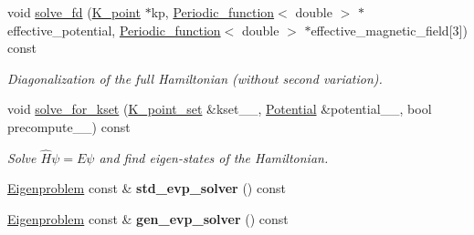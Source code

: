 \begin{DoxyCompactItemize}
void \hyperlink{classsirius_1_1_band_a7a1451542ba6a78e082bd79b68aee540}{solve\+\_\+fd} (\hyperlink{classsirius_1_1_k__point}{K\+\_\+point} $\ast$kp, \hyperlink{classsirius_1_1_periodic__function}{Periodic\+\_\+function}$<$ double $>$ $\ast$effective\+\_\+potential, \hyperlink{classsirius_1_1_periodic__function}{Periodic\+\_\+function}$<$ double $>$ $\ast$effective\+\_\+magnetic\+\_\+field\mbox{[}3\mbox{]}) const 
\begin{DoxyCompactList}\small\item\em Diagonalization of the full Hamiltonian (without second variation). \end{DoxyCompactList}\item 
void \hyperlink{classsirius_1_1_band_a4d39e6e67825eef410af2015d72c06bd}{solve\+\_\+for\+\_\+kset} (\hyperlink{classsirius_1_1_k__point__set}{K\+\_\+point\+\_\+set} \&kset\+\_\+\+\_\+, \hyperlink{classsirius_1_1_potential}{Potential} \&potential\+\_\+\+\_\+, bool precompute\+\_\+\+\_\+) const 
\begin{DoxyCompactList}\small\item\em Solve $ \hat H \psi = E \psi $ and find eigen-\/states of the Hamiltonian. \end{DoxyCompactList}\item 
\hypertarget{classsirius_1_1_band_a8277d3fdd27e399161bd754330f03673}{}\hyperlink{class_eigenproblem}{Eigenproblem} const \& {\bfseries std\+\_\+evp\+\_\+solver} () const \label{classsirius_1_1_band_a8277d3fdd27e399161bd754330f03673}

\item 
\hypertarget{classsirius_1_1_band_a52e40227b78790481482776a3736cecf}{}\hyperlink{class_eigenproblem}{Eigenproblem} const \& {\bfseries gen\+\_\+evp\+\_\+solver} () const \label{classsirius_1_1_band_a52e40227b78790481482776a3736cecf}


\end{DoxyCompactItemize}
